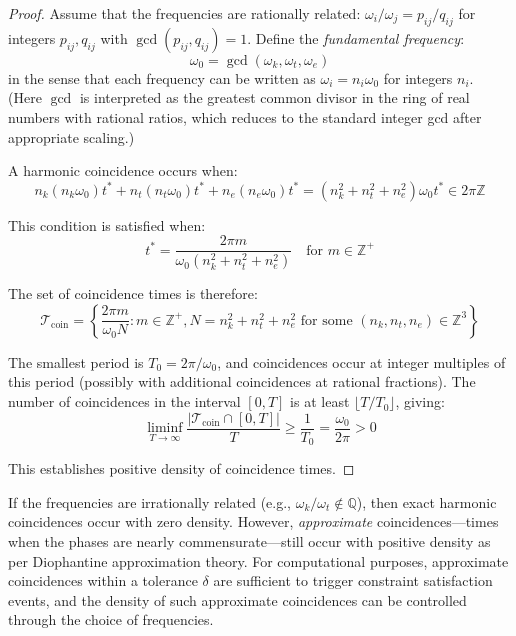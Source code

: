 \begin{proof}
Assume that the frequencies are rationally related: $\omega_i/\omega_j = p_{ij}/q_{ij}$ for integers $p_{ij}, q_{ij}$ with $\gcd(p_{ij}, q_{ij}) = 1$. Define the \textit{fundamental frequency}:
\begin{equation}
\omega_0 = \gcd(\omega_k, \omega_t, \omega_e)
\end{equation}
in the sense that each frequency can be written as $\omega_i = n_i \omega_0$ for integers $n_i$. (Here $\gcd$ is interpreted as the greatest common divisor in the ring of real numbers with rational ratios, which reduces to the standard integer gcd after appropriate scaling.)

A harmonic coincidence occurs when:
\begin{equation}
n_k (n_k \omega_0) t^* + n_t (n_t \omega_0) t^* + n_e (n_e \omega_0) t^* = (n_k^2 + n_t^2 + n_e^2) \omega_0 t^* \in 2\pi\mathbb{Z}
\end{equation}

This condition is satisfied when:
\begin{equation}
t^* = \frac{2\pi m}{\omega_0 (n_k^2 + n_t^2 + n_e^2)} \quad \text{for } m \in \mathbb{Z}^+
\end{equation}

The set of coincidence times is therefore:
\begin{equation}
\mathcal{T}_{\text{coin}} = \left\{ \frac{2\pi m}{\omega_0 N} : m \in \mathbb{Z}^+, N = n_k^2 + n_t^2 + n_e^2 \text{ for some } (n_k, n_t, n_e) \in \mathbb{Z}^3 \right\}
\end{equation}

The smallest period is $T_0 = 2\pi/\omega_0$, and coincidences occur at integer multiples of this period (possibly with additional coincidences at rational fractions). The number of coincidences in the interval $[0, T]$ is at least $\lfloor T/T_0 \rfloor$, giving:
\begin{equation}
\liminf_{T \to \infty} \frac{|\mathcal{T}_{\text{coin}} \cap [0, T]|}{T} \geq \frac{1}{T_0} = \frac{\omega_0}{2\pi} > 0
\end{equation}

This establishes positive density of coincidence times.
\end{proof}

\begin{remark}
\label{rem:irrational_frequencies}
If the frequencies are irrationally related (e.g., $\omega_k/\omega_t \notin \mathbb{Q}$), then exact harmonic coincidences occur with zero density. However, \textit{approximate} coincidences—times when the phases are nearly commensurate—still occur with positive density as per Diophantine approximation theory. For computational purposes, approximate coincidences within a tolerance $\delta$ are sufficient to trigger constraint satisfaction events, and the density of such approximate coincidences can be controlled through the choice of frequencies.
\end{remark}

